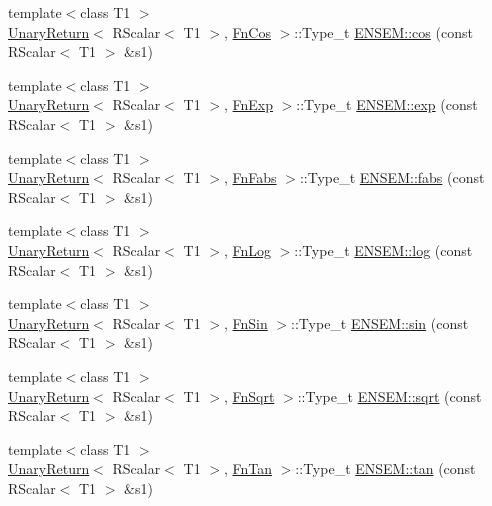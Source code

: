 \begin{DoxyCompactItemize}
\item 
{\footnotesize template$<$class T1 $>$ }\\\mbox{\hyperlink{structUnaryReturn}{Unary\+Return}}$<$ R\+Scalar$<$ T1 $>$, \mbox{\hyperlink{structFnCos}{Fn\+Cos}} $>$\+::Type\+\_\+t \mbox{\hyperlink{group__rscalar_ga5d977b28190b3cf44c5ef2aa98af9156}{E\+N\+S\+E\+M\+::cos}} (const R\+Scalar$<$ T1 $>$ \&s1)
\item 
{\footnotesize template$<$class T1 $>$ }\\\mbox{\hyperlink{structUnaryReturn}{Unary\+Return}}$<$ R\+Scalar$<$ T1 $>$, \mbox{\hyperlink{structFnExp}{Fn\+Exp}} $>$\+::Type\+\_\+t \mbox{\hyperlink{group__rscalar_ga7555010fd1580f0b6a1d85cd4e925ce1}{E\+N\+S\+E\+M\+::exp}} (const R\+Scalar$<$ T1 $>$ \&s1)
\item 
{\footnotesize template$<$class T1 $>$ }\\\mbox{\hyperlink{structUnaryReturn}{Unary\+Return}}$<$ R\+Scalar$<$ T1 $>$, \mbox{\hyperlink{structFnFabs}{Fn\+Fabs}} $>$\+::Type\+\_\+t \mbox{\hyperlink{group__rscalar_ga4f8b1e156677c7d98bb51e70915b9239}{E\+N\+S\+E\+M\+::fabs}} (const R\+Scalar$<$ T1 $>$ \&s1)
\item 
{\footnotesize template$<$class T1 $>$ }\\\mbox{\hyperlink{structUnaryReturn}{Unary\+Return}}$<$ R\+Scalar$<$ T1 $>$, \mbox{\hyperlink{structFnLog}{Fn\+Log}} $>$\+::Type\+\_\+t \mbox{\hyperlink{group__rscalar_gacf4bc45f226554e38012a20a649605ed}{E\+N\+S\+E\+M\+::log}} (const R\+Scalar$<$ T1 $>$ \&s1)
\item 
{\footnotesize template$<$class T1 $>$ }\\\mbox{\hyperlink{structUnaryReturn}{Unary\+Return}}$<$ R\+Scalar$<$ T1 $>$, \mbox{\hyperlink{structFnSin}{Fn\+Sin}} $>$\+::Type\+\_\+t \mbox{\hyperlink{group__rscalar_ga60f574c6e8f0da11360b8c41c46490a5}{E\+N\+S\+E\+M\+::sin}} (const R\+Scalar$<$ T1 $>$ \&s1)
\item 
{\footnotesize template$<$class T1 $>$ }\\\mbox{\hyperlink{structUnaryReturn}{Unary\+Return}}$<$ R\+Scalar$<$ T1 $>$, \mbox{\hyperlink{structFnSqrt}{Fn\+Sqrt}} $>$\+::Type\+\_\+t \mbox{\hyperlink{group__rscalar_ga1f127fac0ef1cb032c7bd632657439bf}{E\+N\+S\+E\+M\+::sqrt}} (const R\+Scalar$<$ T1 $>$ \&s1)
\item 
{\footnotesize template$<$class T1 $>$ }\\\mbox{\hyperlink{structUnaryReturn}{Unary\+Return}}$<$ R\+Scalar$<$ T1 $>$, \mbox{\hyperlink{structFnTan}{Fn\+Tan}} $>$\+::Type\+\_\+t \mbox{\hyperlink{group__rscalar_ga84dc4a2763ad7c0adb4af839501c4c99}{E\+N\+S\+E\+M\+::tan}} (const R\+Scalar$<$ T1 $>$ \&s1)

\end{DoxyCompactItemize}
